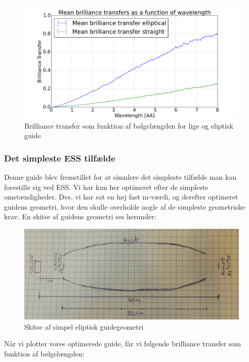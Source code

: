 \documentclass[12pt,oneside,a4paper]{article}
\begin{document}
{{{{{\begin{figure}[H]
\centering
\includegraphics[width=1\textwidth]{st_vs_elip_148950055477097.png}
\caption{Brilliance transfer som funktion af bølgelængden for lige og eliptisk guide}
\end{figure}


\subsubsection{Det simpleste ESS tilfælde}
Denne guide blev fremstillet for at simulere det simpleste tilfælde man kan forestille sig ved ESS. Vi har kun her optimeret efter de simpleste omstændigheder. Dvs. vi har sat en høj fast m-værdi, og derefter optimeret guidens geometri, hvor den skulle overholde nogle af de simpleste geometriske krav.
En skitse af guidens geometri ses herunder:

\begin{figure}[H]
\centering
\includegraphics[width=1\textwidth]{Elips.JPG}
\caption{Skitse af simpel eliptisk guidegeometri}
\end{figure}

Når vi plotter vores optimerede guide, får vi følgende brilliance transfer som funktion af bølgelængden:

}}}}}
\end{document}
